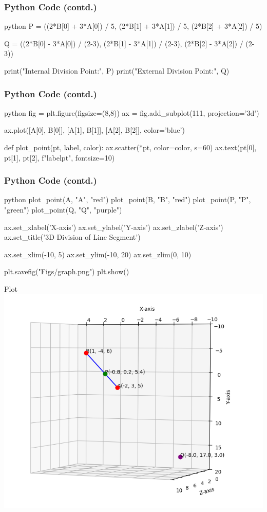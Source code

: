 \documentclass{beamer}
\begin{document}
\begin{frame}[fragile]
\frametitle{Python Code (contd.)}
\begin{mintedbox}{python}
P = ((2*B[0] + 3*A[0]) / 5,
     (2*B[1] + 3*A[1]) / 5,
     (2*B[2] + 3*A[2]) / 5)

Q = ((2*B[0] - 3*A[0]) / (2-3),
     (2*B[1] - 3*A[1]) / (2-3),
     (2*B[2] - 3*A[2]) / (2-3))

print("Internal Division Point:", P)
print("External Division Point:", Q)
\end{mintedbox}
\end{frame}

\begin{frame}[fragile]
\frametitle{Python Code (contd.)}
\begin{mintedbox}{python}
fig = plt.figure(figsize=(8,8))
ax = fig.add_subplot(111, projection='3d')

ax.plot([A[0], B[0]],
        [A[1], B[1]],
        [A[2], B[2]], color='blue')

def plot_point(pt, label, color):
    ax.scatter(*pt, color=color, s=60)
    ax.text(pt[0], pt[1], pt[2],
            f"{label}{pt}", fontsize=10)
\end{mintedbox}
\end{frame}

\begin{frame}[fragile]
\frametitle{Python Code (contd.)}
\begin{mintedbox}{python}
plot_point(A, "A", "red")
plot_point(B, "B", "red")
plot_point(P, "P", "green")
plot_point(Q, "Q", "purple")

ax.set_xlabel('X-axis')
ax.set_ylabel('Y-axis')
ax.set_zlabel('Z-axis')
ax.set_title('3D Division of Line Segment')

ax.set_xlim(-10, 5)
ax.set_ylim(-10, 20)
ax.set_zlim(0, 10)

plt.savefig("Figs/graph.png")
plt.show()
\end{mintedbox}
\end{frame}


\begin{frame}{Plot}
\centering
\includegraphics[width=0.8\linewidth]{Figs/graph.png}
\label{fig1:graph}
\end{frame}
\end{document}
